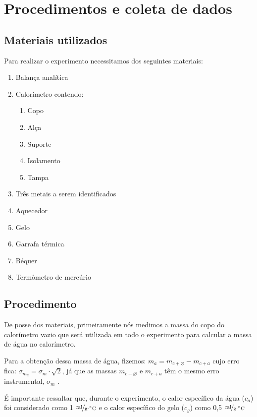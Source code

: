\documentclass[a4paper]{article}
\begin{document}
	\section{Procedimentos e coleta de dados}

		\subsection{Materiais utilizados}

			Para realizar o experimento necessitamos dos seguintes materiais:
			\begin{enumerate}
				\item Balança analítica 
				\item Calorímetro contendo: 
				\begin{enumerate}
					\item Copo 
					\item Alça 
					\item Suporte 
					\item Isolamento 
					\item Tampa 
				\end{enumerate}
				\item Três metais a serem identificados 
				\item Aquecedor 
				\item Gelo 
				\item Garrafa térmica 
				\item Béquer 
				\item Termômetro de mercúrio 
			\end{enumerate}

		\subsection{Procedimento}

			De posse dos materiais, primeiramente nós medimos a massa do copo
			do calorímetro vazio que será utilizada em todo o experimento para
			calcular a massa de água no calorímetro.

			Para a obtenção dessa massa de água, fizemos: $m_{a}=m_{c+\varnothing}-m_{c+a}$
			cujo erro fica: $\sigma_{m_{a}}=\sigma_{m}\cdot\sqrt{2}$, já que
			as massas $m_{c+\varnothing}$ e $m_{c+a}$ têm o mesmo erro instrumental,
			$\sigma_{m}$ .

			É importante ressaltar que, durante o experimento, o calor específico
			da água ($c_{a}$) foi considerado como 1 $\unitfrac{cal}{g\cdot^{\circ}C}$
			e o calor específico do gelo ($c_{g}$) como 0,5 $\unitfrac{cal}{g\cdot^{\circ}C}$
\end{document}
